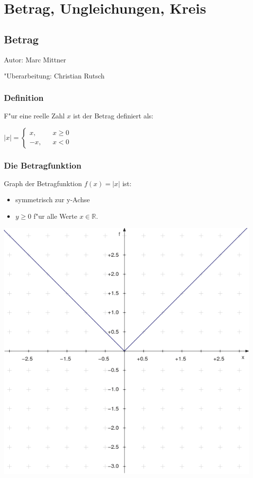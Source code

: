 \chapter{Betrag, Ungleichungen, Kreis}
\section{Betrag}
Autor: Marc Mittner

\noindent "Uberarbeitung: Christian Rutsch

\subsection{Definition}
F"ur eine reelle Zahl $x$ ist der Betrag definiert als: 

$\vert x \vert = \left\{
\begin{array}{ccc}
x, && x \geq 0\\
-x,&&x < 0
\end{array}\right.$

\subsection{Die Betragfunktion}
Graph der Betragfunktion $ f(x) = |x| $ ist:
\begin{itemize}
\item symmetrisch zur y-Achse 
\item $y \geq 0$ f"ur alle Werte $ x \in \mathbb{R} $.
\end{itemize}

\begin{center}
\includegraphics[scale=0.25]{img/betrag/betrag.png}
\end{center}

